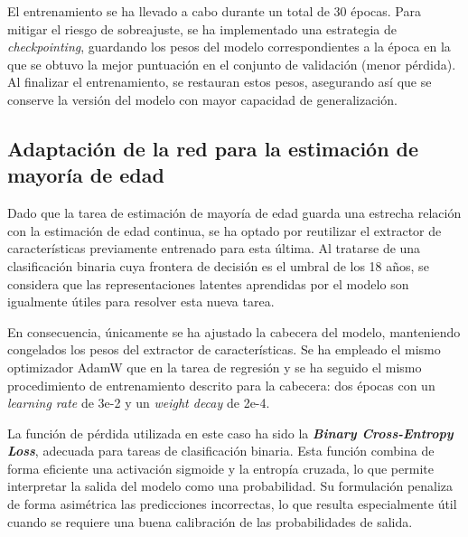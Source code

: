 El entrenamiento se ha llevado a cabo durante un total de 30 épocas. Para mitigar el riesgo de sobreajuste, se ha implementado una estrategia de \textit{checkpointing}, guardando los pesos del modelo correspondientes a la época en la que se obtuvo la mejor puntuación en el conjunto de validación (menor pérdida). Al finalizar el entrenamiento, se restauran estos pesos, asegurando así que se conserve la versión del modelo con mayor capacidad de generalización.



\subsection{Adaptación de la red para la estimación de mayoría de edad}

Dado que la tarea de estimación de mayoría de edad guarda una estrecha relación con la estimación de edad continua, se ha optado por reutilizar el extractor de características previamente entrenado para esta última. Al tratarse de una clasificación binaria cuya frontera de decisión es el umbral de los 18 años, se considera que las representaciones latentes aprendidas por el modelo son igualmente útiles para resolver esta nueva tarea.

En consecuencia, únicamente se ha ajustado la cabecera del modelo, manteniendo congelados los pesos del extractor de características. Se ha empleado el mismo optimizador AdamW que en la tarea de regresión y se ha seguido el mismo procedimiento de entrenamiento descrito para la cabecera: dos épocas con un \textit{learning rate} de 3e-2 y un \textit{weight decay} de 2e-4.

La función de pérdida utilizada en este caso ha sido la \textbf{\textit{Binary Cross-Entropy Loss}}, adecuada para tareas de clasificación binaria. Esta función combina de forma eficiente una activación sigmoide y la entropía cruzada, lo que permite interpretar la salida del modelo como una probabilidad. Su formulación penaliza de forma asimétrica las predicciones incorrectas, lo que resulta especialmente útil cuando se requiere una buena calibración de las probabilidades de salida.

